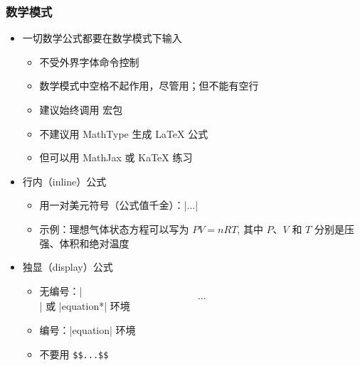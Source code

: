 \begin{frame}[fragile]
\frametitle{数学模式}
\begin{itemize}
  \item 一切数学公式都要在数学模式下输入

    \begin{itemize}
      \item 不受外界字体命令控制
      \item 数学模式中空格不起作用，尽管用；但不能有空行
      \item 建议始终调用  宏包 \pause
      \item \alert{不建议用 MathType 生成 \LaTeX{} 公式}
      \item 但可以用 MathJax  或 KaTeX  练习
    \end{itemize} \pause

  \item 行内（inline）公式

    \begin{itemize}
      \item 用一对美元符号（公式值千金）：|$...$|
      \item 示例：理想气体状态方程可以写为 $PV=nRT$, 其中 $P$、$V$ 和 $T$
        分别是压强、体积和绝对温度
    \end{itemize} \pause

  \item 独显（display）公式

    \begin{itemize}
      \item 无编号：|\[...\]| 或 |equation*| 环境
      \item 编号：|equation| 环境
      \item \alert{不要用 \texttt{\$\$...\$\$}}
    \end{itemize}
\end{itemize}
\end{frame}

